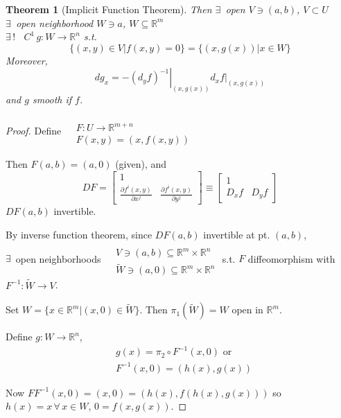 \documentclass[10pt]{amsart}
\newtheorem{theorem}{Theorem}
\begin{document}
\begin{multicols*}{2}
\begin{theorem}[Implicit Function Theorem]
Then $\exists \, $ open $V \ni (a,b)$, $V \subset U$ \\
\phantom{Then} $\exists \, $ open neighborhood $W \ni a$, $W \subseteq \mathbb{R}^m$ \\
\phantom{Then} $\exists \, !$ \, $C^1 \, g:W \to \mathbb{R}^n$ s.t.
\[
\lbrace (x,y) \in V | f(x,y) =0 \rbrace = \lbrace (x,g(x)) | x \in W \rbrace
\]
Moreover,
\[
dg_x = - \left. (d_yf)^{-1} \right|_{(x,g(x))} \left. d_x f\right|_{(x,g(x))}
\]
and $g$ smooth if $f$.  
\end{theorem}

\begin{proof}
  Define $\begin{aligned} & \quad \\
    & F: U \to \mathbb{R}^{m+n}   \\
    & F(x,y) = (x,f(x,y)) \end{aligned}$

Then $F(a,b) = (a,0)$ (given), and 
\[
DF = \left[ \begin{matrix} 1 & \\ 
    \frac{ \partial f^i(x,y)}{ \partial x^j} & \frac{ \partial f^i(x,y) }{ \partial y^j } \end{matrix} \right] \equiv \left[ \begin{matrix} 1 & \\
    D_xf & D_yf \end{matrix} \right]
\]
$DF(a,b)$ invertible.  

By inverse function theorem, since $DF(a,b)$ invertible at pt. $(a,b)$, \\
$\exists \, $ open neighborhoods $\begin{aligned} & \quad \\
  & V \ni (a,b) \subseteq \mathbb{R}^m \times \mathbb{R}^n \\
  & \widetilde{W} \ni (a,0) \subseteq \mathbb{R}^m \times \mathbb{R}^n \end{aligned}$ s.t. $F$ diffeomorphism with $F^{-1}: \widetilde{W} \to V$. 

Set $W = \lbrace x \in \mathbb{R}^m | (x,0) \in \widetilde{W}\rbrace$.  Then $\pi_1(\widetilde{W}) =W$ open in $\mathbb{R}^m$.  

Define $g:W\to \mathbb{R}^n$, 
\[
\begin{aligned}
  & g(x) = \pi_2 \circ F^{-1}(x,0) \text{ or } \\ 
  & F^{-1}(x,0) = (h(x),g(x))
\end{aligned}
\]

Now $FF^{-1}(x,0) = (x,0) = (h(x), f(h(x),g(x)) )$ so $h(x)=x \, \forall \, x \in W$, $0 = f(x,g(x))$.  


\end{proof}
\end{multicols*}
\end{document}
